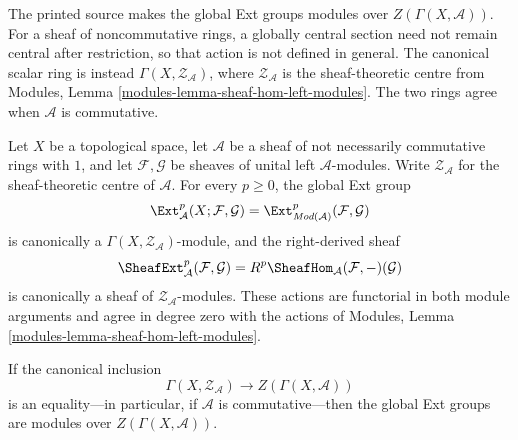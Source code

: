 \begin{lemma}
\label{lemma-ext-center-actions-left-modules}
\begin{reference}
\cite[Chapter IV, \S 4.2, p. 188]{Tohoku}
\end{reference}
\begin{history}
The printed source makes the global Ext groups modules over
$Z(\Gamma(X,\mathcal A))$. For a sheaf of noncommutative rings, a globally
central section need not remain central after restriction, so that action is
not defined in general. The canonical scalar ring is instead
$\Gamma(X,\mathcal Z_{\mathcal A})$, where
$\mathcal Z_{\mathcal A}$ is the sheaf-theoretic centre from Modules, Lemma
\ref{modules-lemma-sheaf-hom-left-modules}. The two rings agree when
$\mathcal A$ is commutative.
\end{history}
Let $X$ be a topological space, let $\mathcal A$ be a sheaf of not
necessarily commutative rings with $1$, and let $\mathcal F,\mathcal G$ be
sheaves of unital left $\mathcal A$-modules. Write
$\mathcal Z_{\mathcal A}$ for the sheaf-theoretic centre of $\mathcal A$.
For every $p\geq0$, the global Ext group
\[
\Ext^p_{\mathcal A}(X;\mathcal F,\mathcal G)
=
\Ext^p_{\textit{Mod}(\mathcal A)}(\mathcal F,\mathcal G)
\]
is canonically a $\Gamma(X,\mathcal Z_{\mathcal A})$-module, and the
right-derived sheaf
\[
\SheafExt^p_{\mathcal A}(\mathcal F,\mathcal G)
=
R^p\SheafHom_{\mathcal A}(\mathcal F,-)(\mathcal G)
\]
is canonically a sheaf of $\mathcal Z_{\mathcal A}$-modules. These actions
are functorial in both module arguments and agree in degree zero with the
actions of Modules, Lemma
\ref{modules-lemma-sheaf-hom-left-modules}.

If the canonical inclusion
\[
\Gamma(X,\mathcal Z_{\mathcal A})
\longrightarrow Z(\Gamma(X,\mathcal A))
\]
is an equality---in particular, if $\mathcal A$ is commutative---then the
global Ext groups are modules over $Z(\Gamma(X,\mathcal A))$.
\end{lemma}

